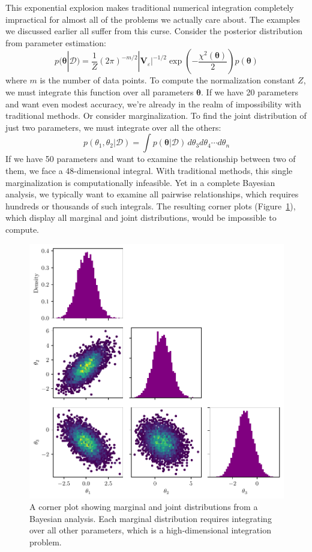 This exponential explosion makes traditional numerical integration completely impractical for almost all of the problems we actually care about. The examples we discussed earlier all suffer from this curse. Consider the posterior distribution from parameter estimation:
\begin{equation}
    p(\boldsymbol{\theta}|\mathcal{D}) = \frac{1}{Z}(2\pi)^{-m/2}|\mathbf{V}_\varepsilon|^{-1/2} \exp\left(-\frac{\chi^2(\boldsymbol{\theta})}{2}\right) p(\boldsymbol{\theta})
\end{equation}
where $m$ is the number of data points. To compute the normalization constant $Z$, we must integrate this function over all parameters $\boldsymbol{\theta}$. If we have 20 parameters and want even modest accuracy, we're already in the realm of impossibility with traditional methods. Or consider marginalization. To find the joint distribution of just two parameters, we must integrate over all the others:
\begin{equation}
p(\theta_1, \theta_2 | \mathcal{D}) = \int p(\boldsymbol{\theta}|\mathcal{D}) \, d\theta_3 d\theta_4 \cdots d\theta_n
\end{equation}
If we have 50 parameters and want to examine the relationship between two of them, we face a 48-dimensional integral. With traditional methods, this single marginalization is computationally infeasible. Yet in a complete Bayesian analysis, we typically want to examine all pairwise relationships, which requires hundreds or thousands of such integrals. The resulting corner plots (Figure~\ref{fig:corner-plot}), which display all marginal and joint distributions, would be impossible to compute.

\begin{figure}[htbp]
    \centering
    \includegraphics[width=.35\textwidth]{figs/monte-carlo/figure_corner_plot.pdf}
    \caption{A corner plot showing marginal and joint distributions from a Bayesian analysis. Each marginal distribution requires integrating over all other parameters, which is a high-dimensional integration problem.}
    \label{fig:corner-plot}
\end{figure}

